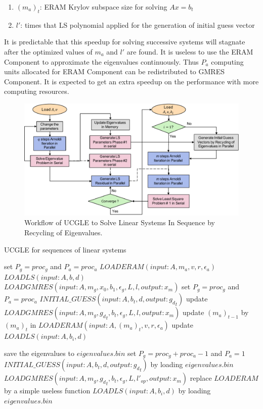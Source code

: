 \begin{enumerate}
	\item $(m_a)_t$: ERAM Krylov subspace size for solving $Ax=b_t$
	\item $l'$: times that LS polynomial applied for the generation of initial guess vector
\end{enumerate}

It is predictable that this speedup for solving successive systems will stagnate after the optimized values of $m_a$ and $l'$ are found. It is useless to use the ERAM Component to approximate the eigenvalues continuously. Thus $P_a$ computing units allocated for ERAM Component can be redistributed to GMRES Component. It is expected to get an extra speedup on the performance with more computing resources.

\begin{figure}[htbp]
	\centering
	\includegraphics[width=.99\linewidth]{fig/uclge_seq_workflow.pdf}
	\caption{Workflow of UCGLE to Solve Linear Systems In Sequence by Recycling of Eigenvalues.}
	\label{fig:uclge_seq_workflow}
\end{figure}

\begin{algorithm}
	\caption{UCGLE for sequences of linear systems}
	\label{alg:gmres_multi}
	\begin{algorithmic}[1]
		\State set $P_g = proc_g$ and $P_a=proc_a$
		\State $LOADERAM(input: A, m_a, v, r, \epsilon_a)$
		\State $LOADLS(input: A,b, d)$
		\State $LOADGMRES(input: A, m_g, x_0, b_1, \epsilon_g, L, l, output: x_m)$
		\Else
		\State set $P_g = proc_g$ and $P_a=proc_a$
		\State $INITIAL\_GUESS(input: A, b_t, d, output: {g_d}_t)$
		\State update $LOADGMRES(input: A, m_g, {g_d}_t, b_{t}, \epsilon_g, L, l, output: x_m)$
		\State update $(m_a)_{t-1}$ by $(m_a)_{t}$ in $LOADERAM(input: A, (m_a)_{t}, v, r, \epsilon_a)$
		\State update $LOADLS(input: A,b_{i}, d)$
		
		\State save the eigenvalues to $eigenvalues.bin$
		\State set $P_g = proc_g+proc_a - 1$ and $P_a=1$
		\State $INITIAL\_GUESS(input: A, b_t, d, output: {g_d}_t)$ by loading $eigenvalues.bin$
		\State $LOADGMRES(input: A, m_g, {g_d}_t, b_{t}, \epsilon_g, L, l'_{op}, output: x_m)$
		\State replace $LOADERAM$ by a simple useless function
		\State $LOADLS(input: A,b_{i}, d)$ by loading $eigenvalues.bin$
		\EndIf
		\EndIf
		\EndFor
	\end{algorithmic}
\end{algorithm}

